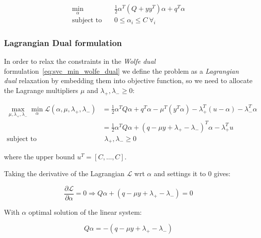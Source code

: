 \begin{equation} \label{eq:svc_min_bcqp_wolf_dual}
    \begin{aligned}
        \min_{\alpha} \quad & \frac{1}{2} \alpha^T (Q + yy^T)\alpha+q^T\alpha \\
            \text{subject to} \quad & 0\leq\alpha_i\leq C \ \forall_i
    \end{aligned}
\end{equation}

\subsubsection{Lagrangian Dual formulation}

In order to relax the constraints in the \emph{Wolfe dual} formulation~\eqref{eq:svc_min_wolfe_dual} we define the problem as a \emph{Lagrangian dual} relaxation by embedding them into objective function, so we need to allocate the Lagrange multipliers $\mu$ and $\lambda_+, \lambda_- \geq 0$:

\begin{equation} \label{eq:svc_lagrangian_dual}
	\begin{aligned}
		    \max_{\mu,\lambda_+,\lambda_-} \min_{\alpha} \mathcal{L}(\alpha,\mu,\lambda_+,\lambda_-) &= \frac{1}{2} \alpha^T Q\alpha+q^T\alpha - \mu^T (y^T \alpha) - \lambda_+^T (u - \alpha) - \lambda_-^T \alpha \\
    &= \frac{1}{2} \alpha^T Q\alpha + (q - \mu y + \lambda_+ - \lambda_-)^T \alpha - \lambda_+^T u \\
    \text{subject to} \quad & \,\, \lambda_+, \lambda_- \geq 0
	\end{aligned}
\end{equation}

where the upper bound $u^T = [C, \dots, C]$.

Taking the derivative of the Lagrangian $\mathcal{L}$ wrt $\alpha$ and settings it to 0 gives:

\begin{equation} \label{eq:svc_lagrangian_der_a}
	\frac{\partial \mathcal{L}}{\partial \alpha}=0\Rightarrow Q \alpha + (q - \mu y + \lambda_+ - \lambda_-) = 0
\end{equation}

With $\alpha$ optimal solution of the linear system:

\begin{equation} \label{eq:svc_lagrangian_sol}
    Q \alpha = - (q - \mu y + \lambda_+ - \lambda_-)
\end{equation}

